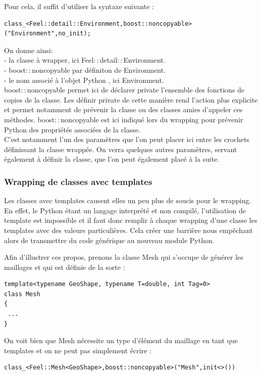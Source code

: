 \documentclass[french,12pt]{article}
\begin{document}
Pour cela, il suffit d'utiliser la syntaxe suivante :
\begin{lstlisting}
class_<Feel::detail::Environment,boost::noncopyable>("Environment",no_init);
\end{lstlisting}

On donne ainsi:\\
- la classe à wrapper, ici Feel$::$detail$::$Environment. \\
- boost$::$noncopyable par définiton de Environment. \\
- le nom associé à l'objet Python , ici Environment. \\

boost$::$noncopyable permet ici de déclarer private l'ensemble des fonctions de copies de la classe. Les définir private de cette manière rend l'action plus explicite et permet notamment de prévenir la classe ou des classes amies d'appeler ces méthodes. 
boost$::$noncopyable est ici indiqué lors du wrapping pour prévenir Python des propriétés associées de la classe.\\

C'est notamment l'un des paramètres que l'on peut placer ici entre les crochets définissant la classe wrappée. On verra quelques autres paramètres, servant également à définir la classe, que l'on peut également placé à la suite.

\subsubsection{Wrapping de classes avec templates}

Les classes avec templates causent elles un peu plus de soucis pour le wrapping. 
En effet, le Python étant un langage interprété et non compilé, l'utilisation de template est impossible et il faut donc remplir à chaque wrapping d'une classe les templates avec des valeurs particulières. Cela créer une barrière nous empêchant alors de transmettre du code générique au nouveau module Python.
\newline

Afin d'illustrer ces propos, prenons la classe Mesh qui s'occupe de générer les maillages et qui est définie de la sorte :
\begin{lstlisting}
template<typename GeoShape, typename T=double, int Tag=0>
class Mesh
{
 ...
}
\end{lstlisting}

On voit bien que Mesh nécessite un type d'élément du maillage en tant que templates et on ne peut pas simplement écrire :
\begin{lstlisting}
class_<Feel::Mesh<GeoShape>,boost::noncopyable>("Mesh",init<>())
\end{lstlisting}
\end{document}
